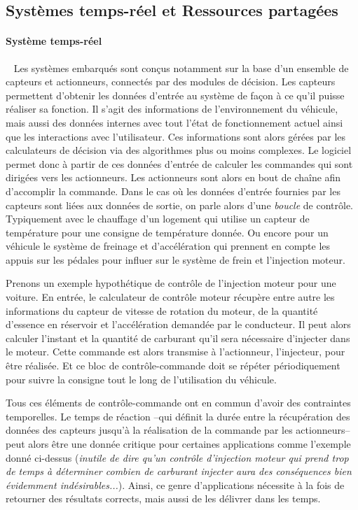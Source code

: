 \documentclass[french, a4paper, 11pt, twoside, pdftex]{StyleThese}
\begin{document}
\subsection{Systèmes temps-réel et Ressources partagées}
	\paragraph{Système temps-réel}~\label{sec:SystemesTempsReels}
	Les systèmes embarqués sont conçus notamment sur la base d'un ensemble de capteurs et actionneurs, connectés par des modules de décision. Les capteurs permettent d'obtenir les données d'entrée au système de façon à ce qu'il puisse réaliser sa fonction. Il s'agit des informations de l'environnement du véhicule, mais aussi des données internes avec tout l'état de fonctionnement actuel ainsi que les interactions avec l'utilisateur. Ces informations sont alors gérées par les calculateurs de décision via des algorithmes plus ou moins complexes. Le logiciel permet donc à partir de ces données d'entrée de calculer les commandes qui sont dirigées vers les actionneurs. Les actionneurs sont alors en bout de chaîne afin d'accomplir la commande. Dans le cas où les données d'entrée fournies par les capteurs sont liées aux données de sortie, on parle alors d'une \emph{boucle} de contrôle. Typiquement avec le chauffage d'un logement qui utilise un capteur de température pour une consigne de température donnée. Ou encore pour un véhicule le système de freinage et d'accélération qui prennent en compte les appuis sur les pédales pour influer sur le système de frein et l'injection moteur.
		
	Prenons un exemple hypothétique de contrôle de l'injection moteur pour une voiture. En entrée, le calculateur de contrôle moteur récupère entre autre les informations du capteur de vitesse de rotation du moteur, de la quantité d'essence en réservoir et l'accélération demandée par le conducteur. Il peut alors calculer l'instant et la quantité de carburant qu'il sera nécessaire d'injecter dans le moteur. Cette commande est alors transmise à l'actionneur, l'injecteur, pour être réalisée. Et ce bloc de contrôle-commande doit se répéter périodiquement pour suivre la consigne tout le long de l'utilisation du véhicule.
		
	Tous ces éléments de contrôle-commande ont en commun d'avoir des contraintes temporelles. Le temps de réaction --qui définit la durée entre la récupération des données des capteurs jusqu'à la réalisation de la commande par les actionneurs--  peut alors être une donnée critique pour certaines applications comme l'exemple donné ci-dessus (\textit{inutile de dire qu'un contrôle d'injection moteur qui prend trop de temps à déterminer combien de carburant injecter aura des conséquences bien évidemment indésirables...}). Ainsi, ce genre d'applications nécessite à la fois de retourner des résultats corrects, mais aussi de les délivrer dans les temps. 
			
\end{document}
